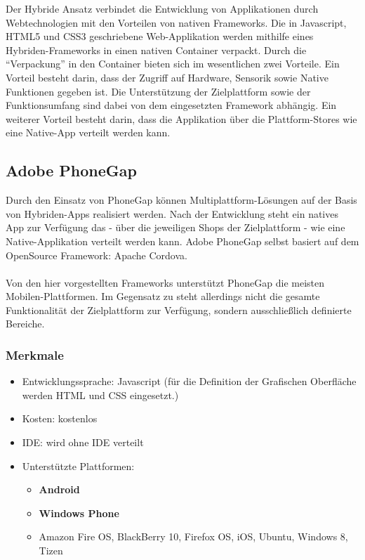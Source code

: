 \documentclass[../Bachelorarbeit.tex]{subfiles}
\begin{document}
Der Hybride Ansatz verbindet die Entwicklung von Applikationen durch Webtechnologien mit den Vorteilen von nativen Frameworks. 
Die in Javascript, \ac{HTML}5 und \ac{CSS}3 geschriebene Web-Applikation werden mithilfe eines Hybriden-Frameworks in einen nativen Container verpackt.
Durch die "`Verpackung"' in den Container bieten sich im wesentlichen zwei Vorteile.
Ein Vorteil besteht darin, dass der Zugriff auf Hardware, Sensorik sowie Native Funktionen gegeben ist. 
Die Unterstützung der Zielplattform sowie der Funktionsumfang sind dabei von dem eingesetzten Framework abhängig.
Ein weiterer Vorteil besteht darin, dass die Applikation über die Plattform-Stores wie eine Native-App verteilt werden kann.



\subsection*{Adobe PhoneGap}
\label{subsec:phonegap}

Durch den Einsatz von PhoneGap können Multiplattform-Lösungen auf der Basis von Hybriden-Apps realisiert werden. 
Nach der Entwicklung steht ein natives App zur Verfügung das - über die jeweiligen Shops der Zielplattform - wie eine Native-Applikation verteilt werden kann.
Adobe PhoneGap selbst basiert auf dem OpenSource Framework: Apache Cordova. \\
\\
Von den hier vorgestellten Frameworks unterstützt PhoneGap die meisten Mobilen-Plattformen. 
Im Gegensatz zu  steht allerdings nicht die gesamte Funktionalität der Zielplattform zur Verfügung, sondern ausschließlich definierte Bereiche.

\subsubsection*{Merkmale}
\begin{itemize}
\item Entwicklungssprache: Javascript (für die Definition der Grafischen Oberfläche werden \ac{HTML} und \ac{CSS} eingesetzt.)
\item Kosten:  kostenlos 
\item \ac{IDE}: wird ohne \ac{IDE} verteilt
\item Unterstützte Plattformen: 
\begin{itemize}
\item \textbf{Android}
\item \textbf{Windows Phone}
\item Amazon Fire OS, BlackBerry 10, Firefox OS, iOS, Ubuntu, Windows 8, Tizen
\end{itemize}
\end{itemize}
\end{document}
